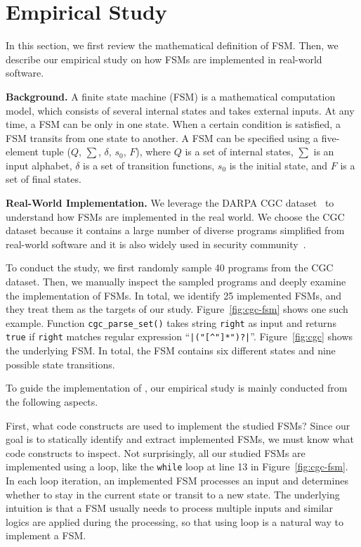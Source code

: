 \section{Empirical Study}
\label{sec:study}
In this section, we first review the mathematical definition of FSM. Then,
we describe our empirical study on how FSMs are implemented 
in real-world software. 

\noindent\textbf{Background.}
A finite state machine (FSM) is a mathematical computation model, 
which consists of several internal states and takes external inputs.
At any time, a FSM can be only in one state. 
When a certain condition is satisfied, 
a FSM transits from one state to another. 
A FSM can be specified using a five-element tuple ($Q$, $\sum$, $\delta$, $s_0$, $F$),
where $Q$ is a set of internal states, $\sum$ is an input alphabet, 
$\delta$ is a set of transition functions,
$s_0$ is the initial state, and $F$ is a set of final states. 

\noindent\textbf{Real-World Implementation.}
We leverage the DARPA CGC dataset~\cite{CGC} to 
understand how FSMs are implemented in the real world. 
We choose the CGC dataset because it 
contains a large number of diverse programs simplified 
from real-world software and it 
is also widely used in security 
community~\cite{QSYM, Driller, VUzzer}. 


To conduct the study, we first randomly sample 
40 programs from the CGC dataset. Then, 
we manually inspect the sampled programs and deeply examine the implementation of FSMs.
In total, we identify 25 implemented FSMs, 
and they treat them as the targets of our study.
Figure~\ref{fig:cgc-fsm} shows one such example.
Function \texttt{cgc\_parse\_set()} takes string \texttt{right} 
as input and returns \texttt{true} if \texttt{right} matches 
regular expression ``\verb/|("[^"]*")?|/''. 
Figure~\ref{fig:cgc} shows the underlying FSM. 
In total, the FSM contains six different states 
and nine possible state transitions. 





To guide the implementation of \Tool{}, our empirical study 
is mainly conducted from the following aspects.

First, what code constructs are used to implement the studied FSMs?
Since our goal is to statically identify and extract implemented FSMs, 
we must know what code constructs to inspect. 
Not surprisingly, all our studied FSMs are implemented using a loop, 
like the \texttt{while} loop at line 13 in Figure~\ref{fig:cgc-fsm}.  
In each loop iteration, an implemented FSM processes an input and 
determines whether to stay in the current state or transit to a new state. 
The underlying intuition is that a FSM usually needs to process 
multiple inputs and similar logics are applied during the processing, 
so that using loop is a natural way to implement a FSM. 

